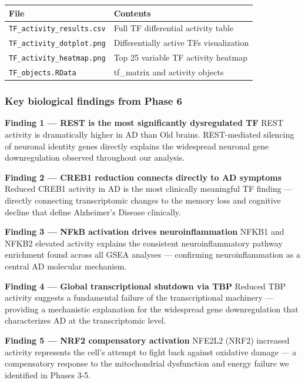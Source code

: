 \documentclass[
]{article}
\begin{document}
\begin{longtable}[]{@{}ll@{}}
\toprule\noalign{}
File & Contents \\
\midrule\noalign{}
\endhead
\bottomrule\noalign{}
\endlastfoot
\texttt{TF\_activity\_results.csv} & Full TF differential activity
table \\
\texttt{TF\_activity\_dotplot.png} & Differentially active TFs
visualization \\
\texttt{TF\_activity\_heatmap.png} & Top 25 variable TF activity
heatmap \\
\texttt{TF\_objects.RData} & tf\_matrix and activity objects \\
\end{longtable}

\subsubsection{Key biological findings from Phase
6}\label{key-biological-findings-from-phase-6}

\textbf{Finding 1 --- REST is the most significantly dysregulated TF}
REST activity is dramatically higher in AD than Old brains.
REST-mediated silencing of neuronal identity genes directly explains the
widespread neuronal gene downregulation observed throughout our
analysis.

\textbf{Finding 2 --- CREB1 reduction connects directly to AD symptoms}
Reduced CREB1 activity in AD is the most clinically meaningful TF
finding --- directly connecting transcriptomic changes to the memory
loss and cognitive decline that define Alzheimer's Disease clinically.

\textbf{Finding 3 --- NFkB activation drives neuroinflammation} NFKB1
and NFKB2 elevated activity explains the consistent neuroinflammatory
pathway enrichment found across all GSEA analyses --- confirming
neuroinflammation as a central AD molecular mechanism.

\textbf{Finding 4 --- Global transcriptional shutdown via TBP} Reduced
TBP activity suggests a fundamental failure of the transcriptional
machinery --- providing a mechanistic explanation for the widespread
gene downregulation that characterizes AD at the transcriptomic level.

\textbf{Finding 5 --- NRF2 compensatory activation} NFE2L2 (NRF2)
increased activity represents the cell's attempt to fight back against
oxidative damage --- a compensatory response to the mitochondrial
dysfunction and energy failure we identified in Phases 3-5.
\end{document}
